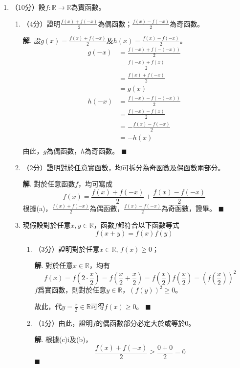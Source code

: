\documentclass[12pt]{article}
\newenvironment*{sol}{\par \textbf{解}.}{\hfill$\blacksquare$}
\begin{document}
    \begin{enumerate}
        \item （10分）設$f:\mathbb{R}\to\mathbb{R}$為實函數。\begin{enumerate}
            \item （4分）證明$\frac{f(x)+f(-x)}{2}$為偶函數；$\frac{f(x)-f(-x)}{2}$為奇函數。\begin{sol}
                設$g(x)=\frac{f(x)+f(-x)}{2}$及$h(x)=\frac{f(x)-f(-x)}{2}$。\begin{align*}
                    g(-x)&=\frac{f(-x)+f(-(-x))}{2}\\
                    &=\frac{f(-x)+f(x)}{2}\\
                    &=\frac{f(x)+f(-x)}{2}\\
                    &=g(x)\\
                    h(-x)&=\frac{f(-x)-f(-(-x))}{2}\\
                    &=\frac{f(-x)-f(x)}{2}\\
                    &=-\frac{f(x)-f(-x)}{2}\\
                    &=-h(x)\\
                \end{align*}
                由此，$g$為偶函數，$h$為奇函數。
            \end{sol}
            \item （2分）證明對於任意實函數，均可拆分為奇函數及偶函數兩部分。\begin{sol}
                對於任意函數$f$，均可寫成$$f(x)=\frac{f(x)+f(-x)}{2}+\frac{f(x)-f(-x)}{2}$$
                根據(a)，$\frac{f(x)+f(-x)}{2}$為偶函數，$\frac{f(x)-f(-x)}{2}$為奇函數，證畢。
            \end{sol}
            \item 現假設對於任意$x,y\in\mathbb{R}$，函數$f$都符合以下函數等式$$f(x+y)=f(x)f(y)$$\begin{enumerate}
                \item （3分）證明對於任意$x\in\mathbb{R}$, $f(x)\geq 0$；\begin{sol}
                    對於任意$x\in\mathbb{R}$，均有$$f(x)=f(2\cdot\frac{x}{2})=f(\frac{x}{2}+\frac{x}{2})=f(\frac{x}{2})f(\frac{x}{2})=(f(\frac{x}{2}))^2$$
                    $f$爲實函數，則對於任意$y\in\mathbb{R}$，$(f(y))^2\geq 0$。
                    
                    故此，代$y=\frac{x}{2}\in\mathbb{R}$可得$f(x)\geq 0$。
                \end{sol}
                \item （1分）由此，證明$f$的偶函數部分必定大於或等於$0$。\begin{sol}
                    根據(c)i及(b)，$$\frac{f(x)+f(-x)}{2}\geq \frac{0+0}{2}=0$$
                \end{sol}
            \end{enumerate}
        \end{enumerate}
    \end{enumerate}
\end{document}
